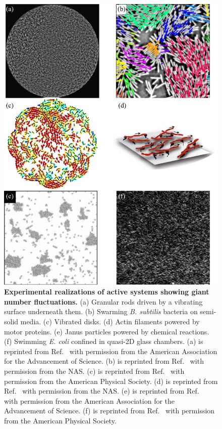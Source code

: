 \begin{figure}[htbp]
 \begin{center}
 \includegraphics[height=4.5 in]{Figs/1-Intro/GNF/GNF-experiments.pdf}
 \end{center}
 \caption[Experimental realizations of active systems showing giant number fluctuations]
 {
 \textbf{Experimental realizations of active systems showing giant number fluctuations.}
 (a) Granular rods driven by a vibrating surface underneath them.
 (b) Swarming \textit{B. subtilis} bacteria on semi-solid media.
 (c) Vibrated disks.
 (d) Actin filaments powered by motor proteins.
 (e) Janus particles powered by chemical reactions.
 (f) Swimming \textit{E. coli} confined in quasi-2D glass chambers.
 (a) is reprinted from Ref.~\cite{Narayan2007} with permission from the American Association for the Advancement of Science.
 (b) is reprinted from Ref.~\cite{Zhang2010} with permission from the NAS.
 (c) is reprinted from Ref.~\cite{Deseigne2010} with permission from the American Physical Society.
 (d) is reprinted from Ref.~\cite{Schaller2013} with permission from the NAS.
 (e) is reprinted from Ref.~\cite{Palacci2013} with permission from the American Association for the Advancement of Science.
 (f) is reprinted from Ref.~\cite{Nishiguchi2017} with permission from the American Physical Society.
 }
 \label{fig:GNF-experiments}
\end{figure}

